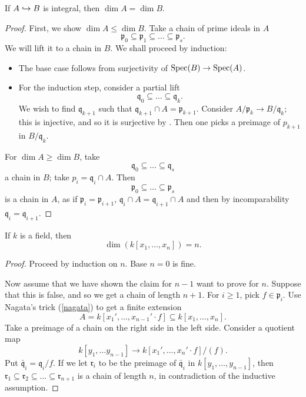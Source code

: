 \begin{prop}
  \label{going-up}
  If $A \hookrightarrow B$ is integral, then $\dim A = \dim B$.
\end{prop}
\begin{proof}
  First, we show $\dim A \leq \dim B$.
  Take a chain of prime ideals in $A$
  \[ \mathfrak p_0 \subseteq \mathfrak p_1 \subseteq \dotso \subseteq \mathfrak p_s.\]
  We will lift it to a chain in $B$. We shall proceed by induction:
  \begin{itemize}
  \item The base case follows from surjectivity of $\text{Spec}(B) \to \text{Spec}(A)$.
  \item For the induction step, consider a partial lift
    \[ \mathfrak q_0 \subseteq \dotso \subseteq \mathfrak q_k.\]
    We wish to find $\mathfrak q_{k+1}$ such that $\mathfrak q_{k+1} \cap A = \mathfrak p_{k+1}$.
    Consider $A/{\mathfrak p_k} \to B/{\mathfrak q_k}$; this is injective, and so it is surjective by
    .
    Then one picks a preimage of $p_{k+1}$ in $B/{\mathfrak q_k}$.
  \end{itemize}
  For $\dim A \geq \dim B$, take
  \[ \mathfrak q_0 \subseteq \dotso \subseteq \mathfrak q_s\]
  a chain in $B$; take $p_i = \mathfrak q_i \cap A$. Then
  \[ \mathfrak p_0 \subseteq \dotso \subseteq \mathfrak p_s\]
  is a chain in $A$, as if $\mathfrak p_i = \mathfrak p_{i+1}$, $\mathfrak q_i \cap A = \mathfrak q_{i+1} \cap A$ and then by incomparability
  $\mathfrak q_i = \mathfrak q_{i+1}$.
\end{proof}

\begin{theorem}
  \label{poly dimension}
  If $k$ is a field, then
  \[\dim (k[x_1, \dotsc, x_n]) = n.\]
\end{theorem}
\begin{proof}
  Proceed by induction on $n$. Base $n=0$ is fine.

  Now assume that we have shown the claim for $n-1$ want to prove for $n$. Suppose that this is false, and so we get a chain of length $n+1$. For $i \geq 1$, pick \(f \in \mathfrak p_i.\)
  Use Nagata's trick (\cref{nagata}) to get a finite extension
  \[ A = k[x_1', \dotsc, x_{n-1}' \cdot f] \subseteq k[x_1, \dotsc, x_n].\]
  Take a preimage of a chain on the right side in the left side.
  Consider a quotient map
  \[ k[y_1, \dotsc y_{n-1}] \to k[x_1', \dotsc, x_n' \cdot f]/{(f)}.\]
  Put $\bar{\mathfrak q}_i = \mathfrak q_i /{f}$.
  If we let $\mathfrak r_i$ to be the preimage of $\bar{\mathfrak q}_i$ in $k[y_1, \dotsc, y_{n-1}]$, then
  \( \mathfrak r_1 \subseteq \mathfrak r_2 \subseteq \dotso \subseteq \mathfrak r_{n+1}\)
  is a chain of length $n$, in contradiction of the inductive assumption.
\end{proof}

